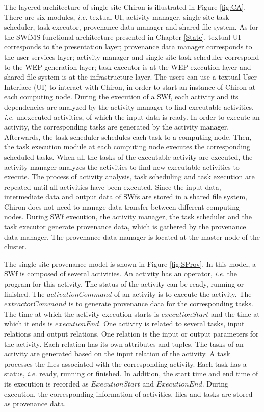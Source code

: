 The layered architecture of single site Chiron is illustrated in Figure \ref{fig:CA}. There are six modules, \textit{i.e.} textual UI, activity manager, single site task scheduler, task executor, provenance data manager and shared file system. 
As for the SWfMS functional architecture presented in Chapter \ref{State}, textual UI corresponds to the presentation layer; provenance data manager corresponds to the user services layer; activity manager and single site task scheduler correspond to the WEP generation layer; task executor is at the WEP execution layer and shared file system is at the infrastructure layer.
The users can use a textual User Interface (UI) to interact with Chiron, in order to start an instance of Chiron at each computing node.
During the execution of a SWf, each activity and its dependencies are analyzed by the activity manager to find executable activities, \textit{i.e.} unexecuted activities, of which the input data is ready.
In order to execute an activity, the corresponding tasks are generated by the activity manager.
Afterwards, the task scheduler schedules each task to a computing node. 
Then, the task execution module at each computing node executes the corresponding scheduled tasks.
When all the tasks of the executable activity are executed, the activity manager analyzes the activities to find new executable activities to execute. The process of activity analysis, task scheduling and task execution are repeated until all activities have been executed.
Since the input data, intermediate data and output data of SWfs are stored in a shared file system, Chiron does not need to manage data transfer between different computing nodes.
During SWf execution, the activity manager, the task scheduler and the task executor generate provenance data, which is gathered by the provenance data manager. The provenance data manager is located at the master node of the cluster.

The single site provenance model \cite{Ogasawara2013} is shown in Figure \ref{fig:SProv}. In this model, a SWf is composed of several activities. An activity has an operator, \textit{i.e.} the program for this activity. The status of the activity can be ready, running or finished. The $activationCommand$ of an activity is to execute the activity. The $extractorCommand$ is to generate provenance data for the corresponding tasks.
The time at which the activity execution starts is $executionStart$ and the time at which it ends is $executionEnd$.
One activity is related to several tasks, input relations and output relations. One relation is the input or output parameters for the activity. Each relation has its own attributes and tuples. The tasks of an activity are generated based on the input relation of the activity. A task processes the files associated with the corresponding activity. Each task has a status, \textit{i.e.} ready, running or finished. In addition, the start time and end time of its execution is recorded as $ExecutionStart$ and $ExecutionEnd$. During execution, the corresponding information of activities, files and tasks are stored as provenance data.

